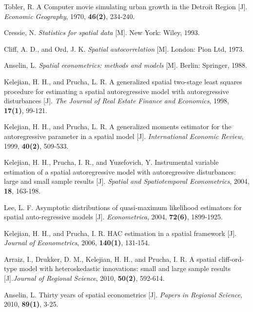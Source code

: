 \documentclass[a4paper,c5size,onecolumn,twoside,cap,Chinese]{APSart}
\begin{document}
\vspace{6mm}
\begin{thebibliography}{99}
\setlength{\parskip}{0pt}  %
\addtolength{\itemsep}{-0.8 em} %
  
Tobler, R. A Computer movie simulating urban growth in the Detroit Region [J]. {\it Economic Geography}, 1970, {\bf 46(2)}, 234-240.

 Cressie, N. {\it Statistics for spatial data} [M]. New York: Wiley, 1993.

Cliff, A. D., and Ord, J. K. {\it Spatial autocorrelation} [M]. London: Pion Ltd, 1973.

Anselin, L. {\it Spatial econometrics: methods and models} [M]. Berlin: Springer, 1988.

 Kelejian, H. H., and Prucha, L. R. A generalized spatial two-stage least squares procedure for estimating a spatial autoregressive model with autoregressive disturbances [J].  {\it The Journal of Real Estate Finance and Economics}, 1998,  {\bf 17(1)}, 99-121.

Kelejian, H. H., and Prucha, L. R. A generalized moments estimator for the autoregressive
parameter in a spatial model [J].  {\it International Economic Review}, 1999,  {\bf 40(2)}, 509-533. 

Kelejian, H. H., Prucha, I. R., and Yuzefovich, Y. Instrumental variable estimation of a spatial autoregressive model with autoregressive disturbances: large and small sample results [J]. {\it Spatial and Spatiotemporal Econometrics}, 2004, {\bf 18}, 163-198. 

Lee, L. F. Asymptotic distributions of quasi-maximum likelihood estimators for spatial auto-regressive models [J]. {\it Econometrica}, 2004, {\bf 72(6)}, 1899-1925.

 Kelejian, H. H., and Prucha, I. R. HAC estimation in a spatial framework [J]. {\it Journal of Econometrics}, 2006,  {\bf 140(1)}, 131-154.

Arraiz, I., Drukker, D. M., Kelejian, H. H., and Prucha, I. R. A spatial cliff-ord- type model with heteroskedastic innovations: small and large sample results [J].{\it Journal of Regional Science}, 2010, {\bf 50(2)}, 592-614.

 Anselin, L. Thirty years of spatial econometrics [J].  {\it Papers in Regional Science}, 2010, {\bf 89(1)},  3-25.


\end{thebibliography}
\end{document}
